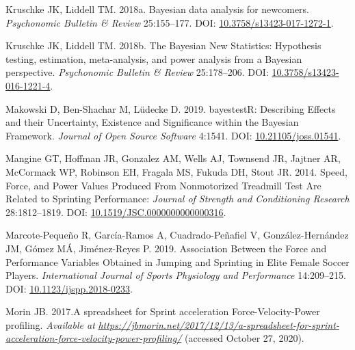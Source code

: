 \documentclass[fleqn,10pt]{wlpeerj} %
\newlength{\cslhangindent}
\newlength{\cslentryspacingunit} %
\newenvironment{CSLReferences}[2] %
 {%
  \setlength{\parindent}{0pt}
  \ifodd #1
  \let\oldpar\par
  \def\par{\hangindent=\cslhangindent\oldpar}
  \fi
  \setlength{\parskip}{#2\cslentryspacingunit}
 }%
 {}
\begin{document}
\begin{CSLReferences}{1}{0}
\leavevmode{}%
Kruschke JK, Liddell TM. 2018a. Bayesian data analysis for newcomers. \emph{Psychonomic Bulletin \& Review} 25:155--177. DOI: \href{https://doi.org/10.3758/s13423-017-1272-1}{10.3758/s13423-017-1272-1}.

\leavevmode{}%
Kruschke JK, Liddell TM. 2018b. The {Bayesian New Statistics}: {Hypothesis} testing, estimation, meta-analysis, and power analysis from a {Bayesian} perspective. \emph{Psychonomic Bulletin \& Review} 25:178--206. DOI: \href{https://doi.org/10.3758/s13423-016-1221-4}{10.3758/s13423-016-1221-4}.

\leavevmode{}%
Makowski D, Ben-Shachar M, Lüdecke D. 2019. {bayestestR}: {Describing Effects} and their {Uncertainty}, {Existence} and {Significance} within the {Bayesian Framework}. \emph{Journal of Open Source Software} 4:1541. DOI: \href{https://doi.org/10.21105/joss.01541}{10.21105/joss.01541}.

\leavevmode{}%
Mangine GT, Hoffman JR, Gonzalez AM, Wells AJ, Townsend JR, Jajtner AR, McCormack WP, Robinson EH, Fragala MS, Fukuda DH, Stout JR. 2014. Speed, {Force}, and {Power Values Produced From Nonmotorized Treadmill Test Are Related} to {Sprinting Performance}: \emph{Journal of Strength and Conditioning Research} 28:1812--1819. DOI: \href{https://doi.org/10.1519/JSC.0000000000000316}{10.1519/JSC.0000000000000316}.

\leavevmode{}%
Marcote-Pequeño R, García-Ramos A, Cuadrado-Peñafiel V, González-Hernández JM, Gómez MÁ, Jiménez-Reyes P. 2019. Association {Between} the {Force} and {Performance Variables Obtained} in {Jumping} and {Sprinting} in {Elite Female Soccer Players}. \emph{International Journal of Sports Physiology and Performance} 14:209--215. DOI: \href{https://doi.org/10.1123/ijspp.2018-0233}{10.1123/ijspp.2018-0233}.

\leavevmode{}%
Morin JB. 2017.A spreadsheet for {Sprint} acceleration {Force}-{Velocity}-{Power} profiling. \emph{Available at} \href{https://jbmorin.net/2017/12/13/a-spreadsheet-for-sprint-acceleration-force-velocity-power-profiling/}{\emph{https://jbmorin.net/2017/12/13/a-spreadsheet-for-sprint-acceleration-force-velocity-power-profiling/}} (accessed October 27, 2020).


\end{CSLReferences}
\end{document}
